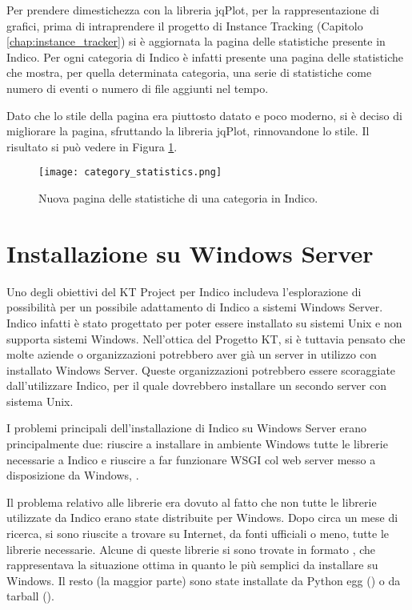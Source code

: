         Per prendere dimestichezza con la libreria jqPlot, per la rappresentazione di grafici, prima di intraprendere il progetto di Instance Tracking (Capitolo \ref{chap:instance_tracker}) si è aggiornata la pagina delle statistiche presente in Indico. Per ogni categoria di Indico è infatti presente una pagina delle statistiche che mostra, per quella determinata categoria, una serie di statistiche come numero di eventi o numero di file aggiunti nel tempo.
        
        Dato che lo stile della pagina era piuttosto datato e poco moderno, si è deciso di migliorare la pagina, sfruttando la libreria jqPlot, rinnovandone lo stile. Il risultato si può vedere in Figura \ref{fig:category_statistics}.
        
       	\begin{figure}[h!]
       		\begin{center}
       			\texttt{[image: category\_statistics.png]}
       		\end{center}
       		\caption[Statistiche di una categoria]{Nuova pagina delle statistiche di una categoria in Indico.}
       		\label{fig:category_statistics}
       	\end{figure}

    \section{Installazione su Windows Server} \label{sec:ap;installazione_windows_server}
    
        Uno degli obiettivi del KT Project per Indico includeva l'esplorazione di possibilità per un possibile adattamento di Indico a sistemi Windows Server. Indico infatti è stato progettato per poter essere installato su sistemi Unix e non supporta sistemi Windows. Nell'ottica del Progetto KT, si è tuttavia pensato che molte aziende o organizzazioni potrebbero aver già un server in utilizzo con installato Windows Server. Queste organizzazioni potrebbero essere scoraggiate dall'utilizzare Indico, per il quale dovrebbero installare un secondo server con sistema Unix.
        
        I problemi principali dell'installazione di Indico su Windows Server erano principalmente due: riuscire a installare in ambiente Windows tutte le librerie necessarie a Indico e riuscire a far funzionare \ac{WSGI} col web server messo a disposizione da Windows, .
        
        Il problema relativo alle librerie era dovuto al fatto che non tutte le librerie utilizzate da Indico erano state distribuite per Windows. Dopo circa un mese di ricerca, si sono riuscite a trovare su Internet, da fonti ufficiali o meno, tutte le librerie necessarie. Alcune di queste librerie si sono trovate in formato , che rappresentava la situazione ottima in quanto le più semplici da installare su Windows. Il resto (la maggior parte) sono state installate da Python egg () o da tarball ().
        
